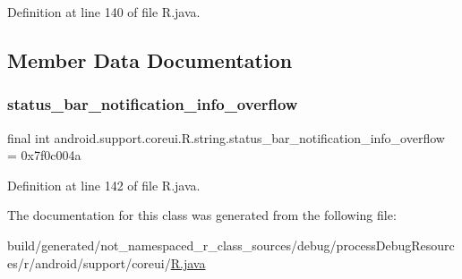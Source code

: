 Definition at line 140 of file R.\+java.


\begin{DoxyCode}{0}

\end{DoxyCode}


\subsection{Member Data Documentation}
\mbox{\label{classandroid_1_1support_1_1coreui_1_1_r_1_1string_adcf4ea883d32357717589d816f0e05ce}} 
\subsubsection{\texorpdfstring{status\_bar\_notification\_info\_overflow}{status\_bar\_notification\_info\_overflow}}
{\footnotesize\ttfamily final int android.\+support.\+coreui.\+R.\+string.\+status\+\_\+bar\+\_\+notification\+\_\+info\+\_\+overflow = 0x7f0c004a\hspace{0.3cm}{\ttfamily [static]}}



Definition at line 142 of file R.\+java.



The documentation for this class was generated from the following file\+:\begin{DoxyCompactItemize}
\item 
build/generated/not\+\_\+namespaced\+\_\+r\+\_\+class\+\_\+sources/debug/process\+Debug\+Resources/r/android/support/coreui/\mbox{\hyperlink{android_2support_2coreui_2_r_8java}{R.\+java}}\end{DoxyCompactItemize}
